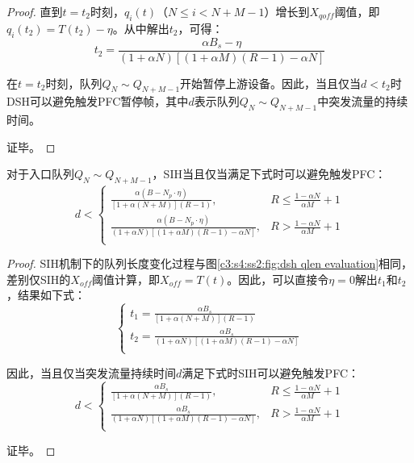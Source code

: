\begin{proof}
  直到$t=t_2$时刻，$q_i(t)$（$N \leqslant i < N + M - 1$）增长到$X_{qoff}$阈值，即$q_i(t_2)=T(t_2)-\eta$。从中解出$t_2$，可得：
  \begin{equation}
    t_2=\frac{\alpha B_s - \eta}{(1+\alpha N)[(1+\alpha M)(R-1)-\alpha N]}
  \end{equation}

  在$t=t_2$时刻，队列$Q_N \sim Q_{N+M-1}$开始暂停上游设备。因此，当且仅当$d<t_2$时DSH可以避免触发PFC暂停帧，其中$d$表示队列$Q_N \sim Q_{N+M-1}$中突发流量的持续时间。

  证毕。
\end{proof}


\begin{theorem}
  对于入口队列$Q_N \sim Q_{N+M-1}$，SIH当且仅当满足下式时可以避免触发PFC：
  \label{thm:c3:burst absorption for SIH}  
  \begin{equation}
    d < 
    \begin{cases}
      \frac{\alpha(B-N_p\cdot \eta)}{[1+\alpha(N+M)](R-1)}, & R\leqslant\frac{1-\alpha N}{\alpha M}+1 \\
      \frac{\alpha(B-N_p\cdot \eta)}{(1+\alpha N)[(1+\alpha M)(R-1)-\alpha N]}, & R>\frac{1-\alpha N}{\alpha M}+1 \\
    \end{cases}
    \label{eqn:c3:sih burst obsorption}
  \end{equation}
  
\end{theorem}

\begin{proof}
  SIH机制下的队列长度变化过程与图\ref{c3:s4:ss2:fig:dsh qlen evaluation}相同，差别仅SIH的$X_{off}$阈值计算，即$X_{off} = T(t)$。因此，可以直接令$\eta = 0$解出$t_1$和$t_2$，结果如下式：
  \begin{equation}
    \begin{cases}
      t_1=\frac{\alpha B_s}{[1+\alpha (N+M)](R-1)} \\
      t_2=\frac{\alpha B_s}{(1+\alpha N)[(1+\alpha M)(R-1)-\alpha N]} \\
    \end{cases}  
    \label{c3:s4:ss2:eqn:t1 and t2 in sih}
  \end{equation}

  因此，当且仅当突发流量持续时间$d$满足下式时SIH可以避免触发PFC：
  \begin{equation}
    d < 
    \begin{cases}
      \frac{\alpha B_s}{[1+\alpha(N+M)](R-1)}, & R\leqslant\frac{1-\alpha N}{\alpha M}+1 \\
      \frac{\alpha B_s}{(1+\alpha N)[(1+\alpha M)(R-1)-\alpha N]}, & R>\frac{1-\alpha N}{\alpha M}+1 \\
    \end{cases}
    \label{eqn:c3:sih:port pause threshold}
  \end{equation}

  证毕。
\end{proof}

